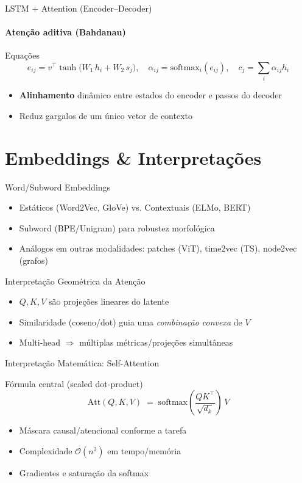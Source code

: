 \documentclass{beamer}
\begin{document}
\begin{frame}{LSTM + Attention (Encoder--Decoder)}
\framesubtitle{Atenção aditiva (Bahdanau)}
\begin{block}{Equações}
\small
\[
e_{ij} = v^\top \tanh\!\big(W_1\,h_i + W_2\,s_j\big), \quad
\alpha_{ij} = \mathrm{softmax}_i(e_{ij}), \quad
c_j = \sum_i \alpha_{ij} h_i
\]
\end{block}
\begin{itemize}[<+->]
  \item \textbf{Alinhamento} dinâmico entre estados do encoder e passos do decoder
  \item Reduz gargalos de um único vetor de contexto
\end{itemize}
\end{frame}

\section{Embeddings \& Interpretações}
\begin{frame}{Word/Subword Embeddings}
\begin{itemize}[<+->]
  \item Estáticos (Word2Vec, GloVe) vs. Contextuais (ELMo, BERT)
  \item Subword (BPE/Unigram) para robustez morfológica
  \item Análogos em outras modalidades: patches (ViT), time2vec (TS), node2vec (grafos)
\end{itemize}
\end{frame}

\begin{frame}{Interpretação Geométrica da Atenção}
\begin{itemize}[<+->]
  \item $Q,K,V$ são projeções lineares do latente
  \item Similaridade (coseno/dot) guia uma \emph{combinação convexa} de $V$
  \item Multi-head $\Rightarrow$ múltiplas métricas/projeções simultâneas
\end{itemize}
\end{frame}

\begin{frame}{Interpretação Matemática: Self-Attention}
\begin{block}{Fórmula central (scaled dot-product)}
\[
\mathrm{Att}(Q,K,V) \;=\; \mathrm{softmax}\!\left(\frac{QK^\top}{\sqrt{d_k}}\right)\,V
\]
\end{block}
\begin{itemize}[<+->]
  \item Máscara causal/atencional conforme a tarefa
  \item Complexidade $\mathcal{O}(n^2)$ em tempo/memória
  \item Gradientes e saturação da softmax
\end{itemize}
\end{frame}
\end{document}
